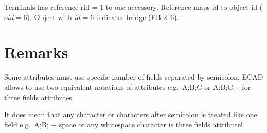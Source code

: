 \documentclass[%
	a4paper,
	oneside,
	listof=numbered,
	parskip=half,
	headsepline=true,
	footsepline=false,
	0.7headlines,
	]{scrbook}
\begin{document}
Terminals has reference rid = 1 to one accessory.
Reference maps id to object id ($oid=6$).
Object with $id=6$ indicates bridge (FB 2--6).

\chapter{Remarks}

Some attributes must use specific number of fields separated by semicolon. 
ECAD allows to use two equivalent notations of attributes e.g.\ A;B;C or A;B;C; - for three fields attributes.

It does mean that any character or characters after semicolon is treated like one field e.g.\ A;B; + \glqq{}space or any whitespace character\grqq{} is three fields attribute!

\listoffigures
\lstlistoflistings

%
%
\end{document}
